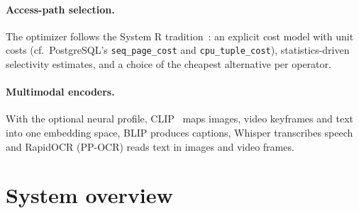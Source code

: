 \documentclass[11pt,a4paper]{article}
\newcommand{\code}[1]{\texttt{\small #1}}
\begin{document}
\paragraph{Access-path selection.} The optimizer follows the System R tradition~\cite{selinger}: an
explicit cost model with unit costs (cf.\ PostgreSQL's \code{seq\_page\_cost} and
\code{cpu\_tuple\_cost}), statistics-driven selectivity estimates, and a choice of the cheapest
alternative per operator.

\paragraph{Multimodal encoders.} With the optional neural profile, CLIP~\cite{clip} maps images, video
keyframes and text into one embedding space, BLIP produces captions, Whisper transcribes speech and
RapidOCR (PP-OCR) reads text in images and video frames.

\section{System overview}
\label{sec:overview}
\end{document}
